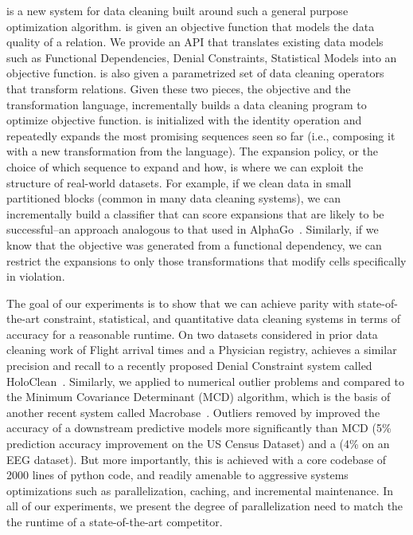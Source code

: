 \sys is a new system for data cleaning built around such a general purpose optimization algorithm.  
\sys is given an objective function that models the data quality of a relation.
We provide an API that translates existing data models such as Functional Dependencies, Denial Constraints, Statistical Models into an objective function.
\sys is also given a parametrized set of data cleaning operators that transform relations.
Given these two pieces, the objective and the transformation language, \sys incrementally builds a data cleaning program to optimize objective function.
\sys is initialized with the identity operation and repeatedly expands the most promising sequences seen so far (i.e., composing it with a new transformation from the language).
The expansion policy, or the choice of which sequence to expand and how, is where we can exploit the structure of real-world datasets.
For example, if we clean data in small partitioned blocks (common in many data cleaning systems), we can incrementally build a classifier that can score expansions that are likely to be successful--an approach analogous to that used in AlphaGo~\cite{silver2016mastering}.
Similarly, if we know that the objective was generated from a functional dependency, we can restrict the expansions to only those transformations that modify cells specifically in violation. 

The goal of our experiments is to show that we can achieve parity with state-of-the-art constraint, statistical, and quantitative data cleaning systems in terms of accuracy for a reasonable runtime.
On two datasets considered in prior data cleaning work of Flight arrival times and a Physician registry, \sys achieves a similar precision and recall to a recently proposed Denial Constraint system called HoloClean~\cite{rekatsinas2017holoclean}. 
Similarly, we applied \sys to numerical outlier problems and compared to the Minimum Covariance Determinant (MCD) algorithm, which is the basis of another recent system called Macrobase~\cite{bailis2016macrobase}.
Outliers removed by \sys  improved the accuracy of a downstream predictive models more significantly than MCD (5\% prediction accuracy improvement on the US Census Dataset) and a (4\% on an EEG dataset). 
But more importantly, this is achieved with a core codebase of 2000 lines of python code, and readily amenable to aggressive systems optimizations such as parallelization, caching, and incremental maintenance.
In all of our experiments, we present the degree of parallelization need to match the the runtime of a state-of-the-art competitor.

